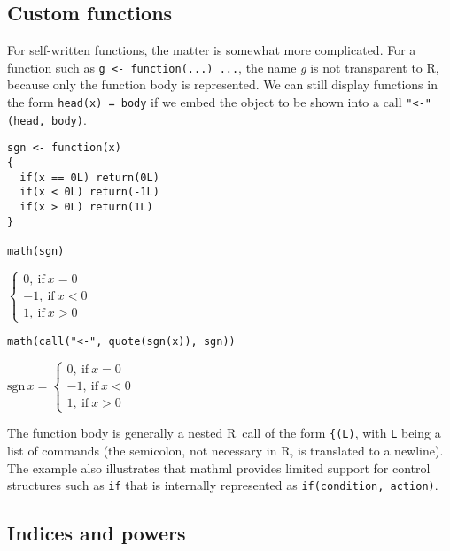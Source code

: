 \hypertarget{custom-functions}{%
\subsection{Custom functions}\label{custom-functions}}

For self-written functions, the matter is somewhat more complicated. For
a function such as \texttt{g~\textless{}-~function(...)~...}, the name \emph{g} is not
transparent to R, because only the function body is represented. We can
still display functions in the form \texttt{head(x)~=~body} if we embed the
object to be shown into a call \texttt{"\textless{}-"(head,~body)}.

\begin{verbatim}
sgn <- function(x)
{
  if(x == 0L) return(0L)
  if(x < 0L) return(-1L)
  if(x > 0L) return(1L)
}

math(sgn)
\end{verbatim}

\(\left\{\begin{array}{l}{{0},\ \mathrm{if}\ {{x}{=}{0}}}\\ {{{-}{1}},\ \mathrm{if}\ {{x}{<}{0}}}\\ {{1},\ \mathrm{if}\ {{x}{>}{0}}}\end{array}\right.\)

\begin{verbatim}
math(call("<-", quote(sgn(x)), sgn))
\end{verbatim}

\({\mathrm{sgn}\,{x}}{=}{\left\{\begin{array}{l}{{0},\ \mathrm{if}\ {{x}{=}{0}}}\\ {{{-}{1}},\ \mathrm{if}\ {{x}{<}{0}}}\\ {{1},\ \mathrm{if}\ {{x}{>}{0}}}\end{array}\right.}\)

The function body is generally a nested R~call of the form \texttt{\{(L)}, with
\texttt{L} being a list of commands (the semicolon, not necessary in R, is
translated to a newline). The example also illustrates that mathml
provides limited support for control structures such as \texttt{if} that is
internally represented as \texttt{if(condition,~action)}.

\hypertarget{indices-and-powers}{%
\subsection{Indices and powers}\label{indices-and-powers}}

